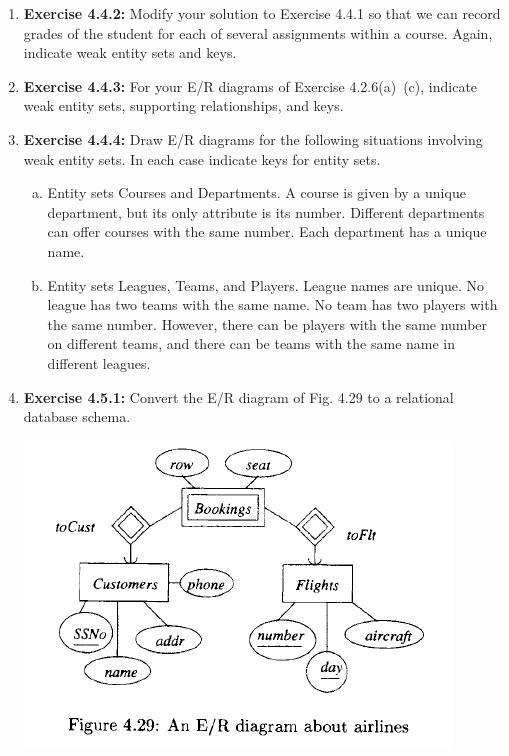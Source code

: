 \documentclass[12pt]{article}
\begin{document}
\begin{enumerate}[1.]
    \item \textbf{Exercise 4.4.2:} Modify your solution to Exercise 4.4.1 so that we can record
    grades of the student for each of several assignments within a course. Again,
    indicate weak entity sets and keys.

    \item \textbf{Exercise 4.4.3:} For your E/R diagrams of Exercise 4.2.6(a)~(c), indicate weak
    entity sets, supporting relationships, and keys.

    \item \textbf{Exercise 4.4.4:} Draw E/R diagrams for the following situations involving
    weak entity sets. In each case indicate keys for entity sets.

    \begin{enumerate}[a)]
        \item Entity sets Courses and Departments. A course is given by a unique department, but its only attribute is its number. Different departments can offer courses with the same number. Each department has a unique name.
        \item Entity sets Leagues, Teams, and Players. League names are unique. No league has two teams with the same name. No team has two players with the same number. However, there can be players with the same number on different teams, and there can be teams with the same name in different leagues.
    \end{enumerate}

    \item \textbf{Exercise 4.5.1:} Convert the E/R diagram of Fig. 4.29 to a relational database
    schema.

    \bigskip

    \begin{center}
    \includegraphics[width=0.7\linewidth]{images/worksheet_14_8.png}
    \end{center}


\end{enumerate}
\end{document}
